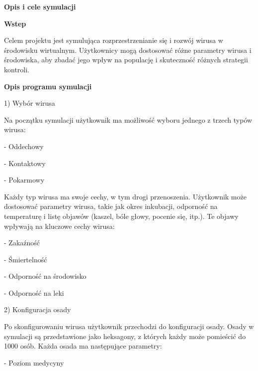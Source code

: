 \documentclass[a4paper]{article}
\begin{document}
\pagestyle{Convertedii}
\thispagestyle{Convertedi}
\newpage
{\centering
\foreignlanguage{polish}{\textbf{Opis i cele symulacji}}
\par}


\bigskip

{\centering
\foreignlanguage{polish}{\textbf{Wstep}}
\par}

\foreignlanguage{polish}{Celem projektu jest symulująca rozprzestrzenianie się i rozwój wirusa w środowisku wirtualnym.
Użytkownicy mogą dostosować różne parametry wirusa i środowiska, aby zbadać jego wpływ na populację i skuteczność
różnych strategii kontroli.}


\bigskip

{\centering
\foreignlanguage{polish}{\textbf{Opis programu symulacji}}
\par}

\foreignlanguage{polish}{1) Wybór wirusa}

\foreignlanguage{polish}{Na początku symulacji użytkownik ma możliwość wyboru jednego z trzech typów wirusa:}

\foreignlanguage{polish}{{}- Oddechowy}

\foreignlanguage{polish}{{}- Kontaktowy}

\foreignlanguage{polish}{{}- Pokarmowy}


\bigskip

\foreignlanguage{polish}{Każdy typ wirusa ma swoje cechy, w tym drogi przenoszenia. Użytkownik może dostosować parametry
wirusa, takie jak okres inkubacji, odporność na temperaturę i listę objawów (kaszel, bóle głowy, pocenie się, itp.). Te
objawy wpływają na kluczowe cechy wirusa:}

\foreignlanguage{polish}{{}- Zakaźność}

\foreignlanguage{polish}{{}- Śmiertelność}

\foreignlanguage{polish}{{}- Odporność na środowisko}

\foreignlanguage{polish}{{}- Odporność na leki}


\bigskip

\foreignlanguage{polish}{2) Konfiguracja osady}

\foreignlanguage{polish}{Po skonfigurowaniu wirusa użytkownik przechodzi do konfiguracji osady. Osady w symulacji są
przedstawione jako heksagony, z których każdy może pomieścić do 1000 osób. Każda osada ma następujące parametry:}

\foreignlanguage{polish}{{}- Poziom medycyny}
\end{document}
